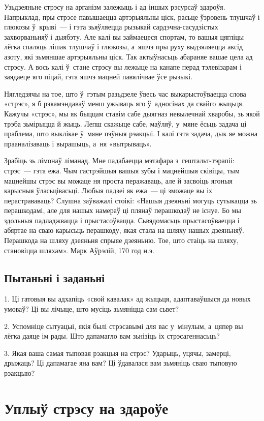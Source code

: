 Узьдзеяньне стрэсу на арганізм залежыць і ад іншых рэсурсаў здароўя. Напрыклад, пры стрэсе павышаецца артэрыяльны ціск, расьце ўзровень тлушчаў і глюкозы ў~крыві~--- і гэта зьяўляецца рызыкай сардэчна-сасудзістых захворваньняў і дыябэту. Але калі вы займаецеся спортам, то вашыя цягліцы лёгка спаляць лішак тлушчаў і глюкозы, а~яшчэ пры руху выдзяляецца аксід азоту, які зьмяншае артэрыяльны ціск. Так актыўнасьць абараняе вашае цела ад стрэсу. А вось калі ў~стане стрэсу вы лежыце на канапе перад тэлевізарам і заядаеце яго піцай, гэта яшчэ мацней павялічвае ўсе рызыкі.

Нягледзячы на тое, што ў~гэтым разьдзеле ўвесь час выкарыстоўваецца слова «стрэс», я б рэкамэндаваў менш ужываць яго ў~адносінах да свайго жыцьця. Кажучы «стрэс», мы як быццам ставім сабе дыягназ невылечнай хваробы, зь якой трэба зьмірыцца й жыць. Лепш скажыце сабе, маўляў, у~мяне ёсьць задача ці праблема, што выклікае ў~мяне пэўныя рэакцыі. І калі гэта задача, дык яе можна прааналізаваць і вырашыць, а~ня «вытрываць».

Зрабіць зь лімонаў ліманад. Мне падабаецца мэтафара з~гештальт-тэрапіі: стрэс~--- гэта ежа. Чым гастрэйшыя вашыя зубы і мацнейшыя сківіцы, тым мацнейшы стрэс вы можаце ня проста перажаваць, але й засвоіць ягоныя карысныя ўласьцівасьці. Любыя падзеі як ежа~--- ці зможаце вы іх перастрававаць? Слушна заўважалі стоікі: «Нашыя дзеяньні могуць сутыкацца зь перашкодамі, але для нашых намераў ці плянаў перашкодаў не існуе. Бо мы здольныя падладжвацца і прыстасоўвацца. Сьвядомасьць прыстасоўваецца і абяртае на сваю карысьць перашкоду, якая стала на шляху нашых дзеяньняў. Перашкода на шляху дзеяньня спрыяе дзеяньню. Тое, што стаіць на шляху, становіцца шляхам». Марк Аўрэлій, 170 год н.э.

\subsection*{Пытаньні і заданьні}

1. Ці гатовыя вы адхапіць «свой кавалак» ад жыцьця, адаптаваўшыся да новых умоваў? Ці вы лічыце, што мусіць зьмяніцца сам сьвет?

2. Успомніце сытуацыі, якія былі стрэсавымі для вас у~мінулым, а~цяпер вы лёгка даяце ім рады. Што дапамагло вам зьнізіць іх стрэсагеннасьць?

3. Якая ваша самая тыповая рэакцыя на стрэс? Ударыць, уцячы, замерці, дрыжаць? Ці дапамагае яна вам? Ці ўдавалася вам зьмяніць сваю тыповую рэакцыю?


\section{Уплыў стрэсу на здароўе}

